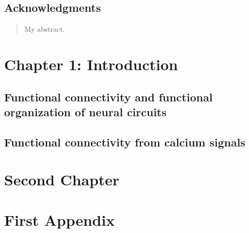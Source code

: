\documentclass[12pt,twoside,openright]{report}
\begin{document}
\section*{Acknowledgments}

\begin{abstract}
My abstract.
\end{abstract}

\tableofcontents

\listoffigures

\listoftables

\chapter{Chapter 1: Introduction}

\section{Functional connectivity and functional organization of neural circuits}

\section{Functional connectivity from calcium signals}

\chapter{Second Chapter}

\appendix

\chapter{First Appendix}
\end{document}
